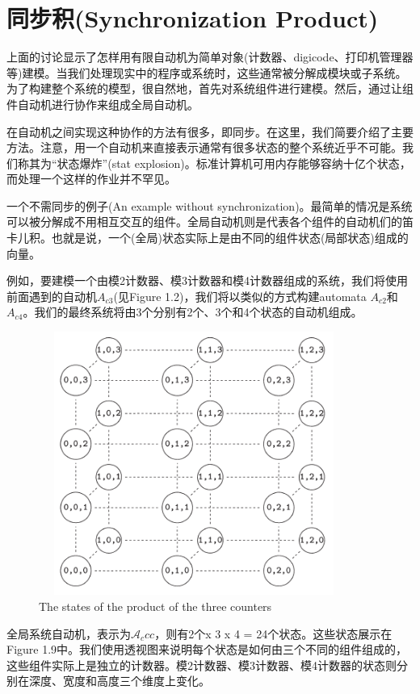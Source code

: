\documentclass{book}
\begin{document}
    \section{同步积(Synchronization Product)}
    上面的讨论显示了怎样用有限自动机为简单对象(计数器、digicode、打印机管理器等)建模。当我们处理现实中的程序或系统时，这些通常被分解成模块或子系统。为了构建整个系统的模型，很自然地，首先对系统组件进行建模。然后，通过让组件自动机进行协作来组成全局自动机。

    在自动机之间实现这种协作的方法有很多，即同步。在这里，我们简要介绍了主要方法。注意，用一个自动机来直接表示通常有很多状态的整个系统近乎不可能。我们称其为“状态爆炸”(stat explosion)。标准计算机可用内存能够容纳十亿个状态，而处理一个这样的作业并不罕见。

    一个不需同步的例子(An example without synchronization)。最简单的情况是系统可以被分解成不用相互交互的组件。全局自动机则是代表各个组件的自动机们的笛卡儿积。也就是说，一个(全局)状态实际上是由不同的组件状态(局部状态)组成的向量。

    例如，要建模一个由模2计数器、模3计数器和模4计数器组成的系统，我们将使用前面遇到的自动机$A_{c3}$(见Figure 1.2)，我们将以类似的方式构建automata $A_{c2}$和$A_{c4}$。我们的最终系统将由3个分别有2个、3个和4个状态的自动机组成。
    \begin{figure}
    \centering
    \includegraphics[height=3.4in,width=4.0in]{1_9.png}
    \caption{The states of the product of the three counters}
    \end{figure}
    全局系统自动机，表示为$\mathcal{A}_ccc$，则有2个x 3 x 4 = 24个状态。这些状态展示在Figure 1.9中。我们使用透视图来说明每个状态是如何由三个不同的组件组成的，这些组件实际上是独立的计数器。模2计数器、模3计数器、模4计数器的状态则分别在深度、宽度和高度三个维度上变化。
\end{document}
